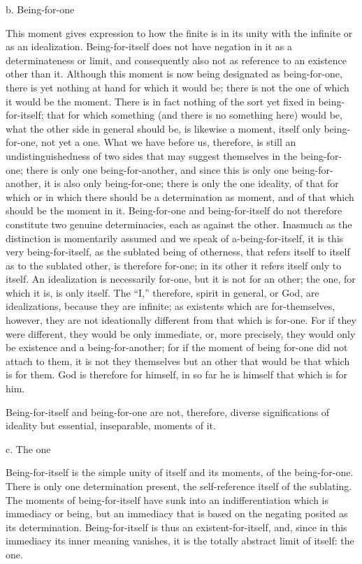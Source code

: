 b. Being-for-one

This moment gives expression to how the finite is
in its unity with the infinite or as an idealization.
Being-for-itself does not have negation in it as
a determinateness or limit,
and consequently also not as reference
to an existence other than it.
Although this moment is now being
designated as being-for-one,
there is yet nothing at hand for which it would be;
there is not the one of which it would be the moment.
There is in fact nothing of the sort
yet fixed in being-for-itself;
that for which something (and there is no something here)
would be, what the other side in general should be,
is likewise a moment,
itself only being-for-one,
not yet a one.
What we have before us, therefore,
is still an undistinguishedness of two sides
that may suggest themselves in the being-for-one;
there is only one being-for-another,
and since this is only one being-for-another,
it is also only being-for-one;
there is only the one ideality,
of that for which or in which
there should be a determination as moment,
and of that which should be the moment in it.
Being-for-one and being-for-itself do not therefore
constitute two genuine determinacies,
each as against the other.
Inasmuch as the distinction is momentarily assumed
and we speak of a-being-for-itself,
it is this very being-for-itself,
as the sublated being of otherness,
that refers itself to itself as to the sublated other,
is therefore for-one;
in its other it refers itself only to itself.
An idealization is necessarily for-one,
but it is not for an other;
the one, for which it is, is only itself.
The “I,” therefore, spirit in general,
or God, are idealizations,
because they are infinite;
as existents which are for-themselves, however,
they are not ideationally different
from that which is for-one.
For if they were different,
they would be only immediate,
or, more precisely, they would only be
existence and a being-for-another;
for if the moment of being for-one did
not attach to them,
it is not they themselves
but an other that would be
that which is for them.
God is therefore for himself,
in so far he is himself
that which is for him.

Being-for-itself and being-for-one are not, therefore,
diverse significations of ideality
but essential, inseparable, moments of it.

c. The one

Being-for-itself is the simple unity of
itself and its moments, of the being-for-one.
There is only one determination present,
the self-reference itself of the sublating.
The moments of being-for-itself have sunk into
an indifferentiation which is immediacy or being,
but an immediacy that is based on
the negating posited as its determination.
Being-for-itself is thus an existent-for-itself,
and, since in this immediacy its inner meaning vanishes,
it is the totally abstract limit of itself: the one.

